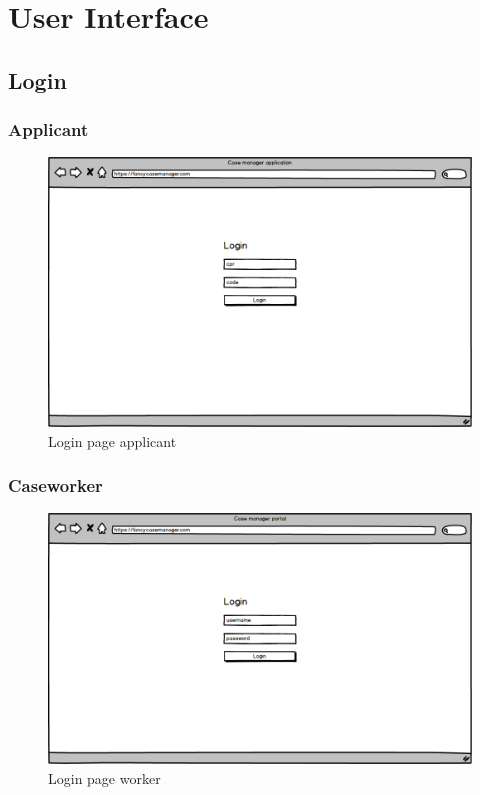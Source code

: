 \newpage
\section{User Interface}

\subsection{Login}

\subsubsection{Applicant}

\begin{figure}[htb!]
    \centering
    \includegraphics[width=\textwidth]{img/page-login-applicant.png}
    \caption{Login page applicant}
\end{figure}
\newpage
\subsubsection{Caseworker}
\begin{figure}[htb!]
    \centering
    \includegraphics[width=\textwidth]{img/page-login-worker.png}
    \caption{Login page worker}
\end{figure}

